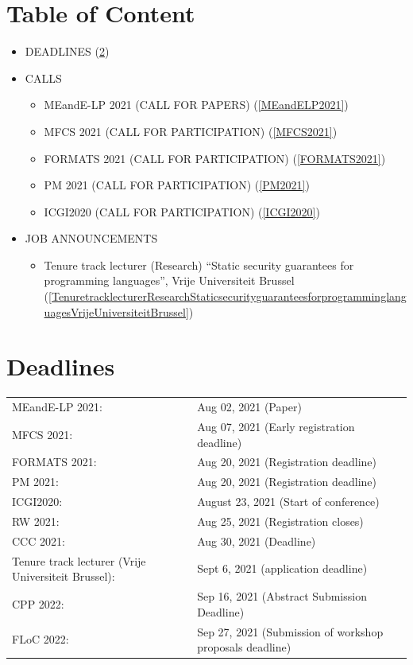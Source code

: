 \documentclass[prodmode,acmtecs]{acmsmall} %
\begin{document}
\section{Table of Content}\begin{itemize}\item DEADLINES (\cref{deadlines}) 
 
\item CALLS 
 
\begin{itemize}\item MEandE-LP 2021 (CALL FOR PAPERS) (\cref{MEandELP2021})
\item MFCS 2021 (CALL FOR PARTICIPATION) (\cref{MFCS2021})
\item FORMATS 2021 (CALL FOR PARTICIPATION) (\cref{FORMATS2021})
\item PM 2021 (CALL FOR PARTICIPATION) (\cref{PM2021})
\item ICGI2020 (CALL FOR PARTICIPATION) (\cref{ICGI2020})
\end{itemize} 
\item JOB ANNOUNCEMENTS 
 
\begin{itemize}\item Tenure track lecturer (Research) “Static security guarantees for programming languages”, Vrije Universiteit Brussel (\cref{TenuretracklecturerResearchStaticsecurityguaranteesforprogramminglanguagesVrijeUniversiteitBrussel})
\end{itemize} 
\end{itemize}\section{Deadlines}\label{deadlines}\begin{tabulary}{\linewidth}{LL}MEandE-LP 2021:  & Aug 02, 2021 (Paper) \\
MFCS 2021:  & Aug 07, 2021 (Early registration deadline) \\
FORMATS 2021:  & Aug 20, 2021 (Registration deadline) \\
PM 2021:  & Aug 20, 2021 (Registration deadline) \\
ICGI2020:  & August 23, 2021 (Start of conference) \\
RW 2021:  & Aug 25, 2021 (Registration closes) \\
CCC 2021:  & Aug 30, 2021 (Deadline) \\
Tenure track lecturer (Vrije Universiteit Brussel):  & Sept 6, 2021 (application deadline) \\
CPP 2022:  & Sep 16, 2021 (Abstract Submission Deadline) \\
FLoC 2022:  & Sep 27, 2021 (Submission of workshop proposals deadline) \\
\end{tabulary}
\end{document}
